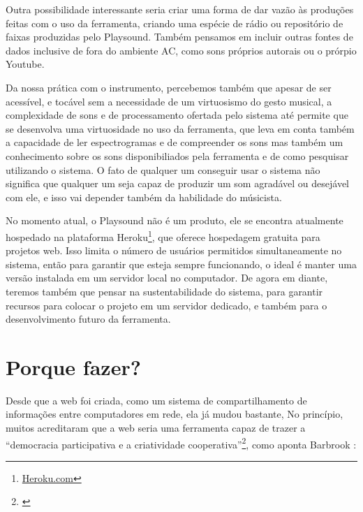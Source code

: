 Outra possibilidade interessante seria criar uma forma de dar vazão às produções feitas com o uso da ferramenta, criando uma espécie de rádio ou repositório de faixas produzidas pelo Playsound. Também pensamos em incluir outras fontes de dados inclusive de fora do ambiente AC, como sons próprios autorais ou o prórpio Youtube.

Da nossa prática com o instrumento, percebemos também que apesar de ser acessível, e tocável sem a necessidade de um virtuosismo do gesto musical, a complexidade de sons e de processamento ofertada pelo sistema até permite que se desenvolva uma virtuosidade no uso da ferramenta, que leva em conta também a capacidade de ler espectrogramas e de compreender os sons mas também um conhecimento sobre os sons disponibiliados pela ferramenta e de como pesquisar utilizando o sistema. O fato de qualquer um conseguir usar o sistema não significa que qualquer um seja capaz de produzir um som agradável ou desejável com ele, e isso vai depender também da habilidade do músicista. 

No momento atual, o Playsound não é um produto, ele se encontra atualmente hospedado na plataforma Heroku\footnote{\url{Heroku.com}}, que oferece hospedagem gratuita para projetos web. Isso limita o número de usuários permitidos simultaneamente no sistema, então para garantir que esteja sempre funcionando, o ideal é manter uma versão instalada em um servidor local no computador. De agora em diante, teremos também que pensar na sustentabilidade do sistema, para garantir recursos para colocar o projeto em um servidor dedicado, e também para o desenvolvimento futuro da ferramenta. 









\section{Porque fazer?}

Desde que a web foi criada, como um sistema de compartilhamento de informações entre computadores em rede, ela já mudou bastante, No princípio, muitos acreditaram que a web seria uma ferramenta capaz de trazer a ``democracia participativa e a criatividade cooperativa''\footnote{\cite[360]{Barbrook2009}}, como aponta Barbrook \citeyear{barbrook2009}:


